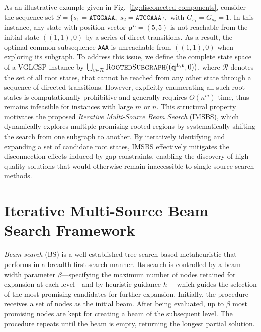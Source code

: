 \documentclass[runningheads]{llncs}
\begin{document}
	As an illustrative example given in Fig.~\ref{fig:disconected-components}, consider the sequence set $S = \{ s_1 = \texttt{ATGGAAA},\; s_2 = \texttt{ATCCAAA} \},$
	with  $G_{s_1} = G_{s_2} = {1}$. In this instance, any state with position vector $\mathbf{p}^L = (5,5)$ is not reachable from the initial state $((1,1),0)$ by a series of direct transitions. As a result, the optimal common subsequence \texttt{AAA} is unreachable from $((1,1),0)$  when exploring its subgraph. To address this issue, we define the complete state space of a VGLCSP instance by  
	$\bigcup_{v \in \mathcal{R}} \textsc{RootedSubgraph}((\mathbf{q}^{L, v},0))$,  
	where $\mathcal{R}$ denotes the set of all root states,  
	that cannot be reached from any other state through a sequence of directed transitions. However, explicitly enumerating all such root states is computationally prohibitive and generally requires $O(n^m)$ time, thus remains infeasible for instances with large $m$ or $n$.  This structural property motivates the proposed \textit{Iterative Multi-Source Beam Search} (IMSBS), which dynamically explores multiple promising rooted regions by systematically shifting the search from one subgraph to another. By iteratively identifying and expanding a set of candidate root states, IMSBS effectively mitigates the disconnection effects induced by gap constraints, enabling the discovery of high-quality solutions that would otherwise remain inaccessible to single-source search methods.
	
	
	
	\section{Iterative Multi-Source Beam Search Framework}\label{sec: imsbs}
	
	\textit{Beam search} (BS) is a well-established tree-search-based metaheuristic that performs in a breadth-first-search manner. Its search is controlled by a beam width parameter $\beta$---specifying the maximum number of nodes retained for expansion at each level---and by  heuristic guidance $h$--- which guides the selection of the most promising candidates for further expansion. Initially, the procedure receives a set of nodes as the initial beam. After being evaluated, up to $\beta$ most promising nodes are kept for creating a beam of the subsequent level. The procedure repeats until the beam is empty, returning the longest partial solution. 
	
\end{document}
